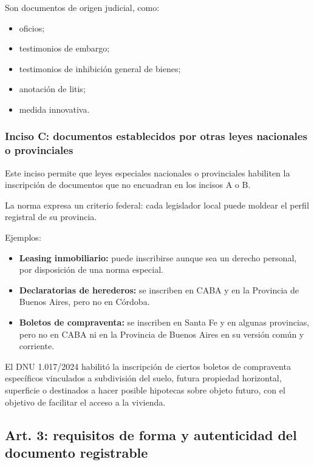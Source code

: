 \documentclass[12pt]{book}
\begin{document}
Son documentos de origen judicial, como:

\begin{itemize}
    \item oficios;
    \item testimonios de embargo;
    \item testimonios de inhibici\'on general de bienes;
    \item anotaci\'on de litis;
    \item medida innovativa.
\end{itemize}

\subsubsection{Inciso C: documentos establecidos por otras leyes nacionales o provinciales}

Este inciso permite que leyes especiales nacionales o provinciales habiliten la inscripci\'on de documentos que no encuadran en los incisos A o B.

La norma expresa un criterio federal: cada legislador local puede moldear el perfil registral de su provincia.

Ejemplos:

\begin{itemize}
    \item \textbf{Leasing inmobiliario:} puede inscribirse aunque sea un derecho personal, por disposici\'on de una norma especial.
    \item \textbf{Declaratorias de herederos:} se inscriben en CABA y en la Provincia de Buenos Aires, pero no en C\'ordoba.
    \item \textbf{Boletos de compraventa:} se inscriben en Santa Fe y en algunas provincias, pero no en CABA ni en la Provincia de Buenos Aires en su versi\'on com\'un y corriente.
\end{itemize}

El DNU 1.017/2024 habilit\'o la inscripci\'on de ciertos boletos de compraventa espec\'ificos vinculados a subdivisi\'on del suelo, futura propiedad horizontal, superficie o destinados a hacer posible hipotecas sobre objeto futuro, con el objetivo de facilitar el acceso a la vivienda.

\subsection{Art. 3: requisitos de forma y autenticidad del documento registrable}
\end{document}
